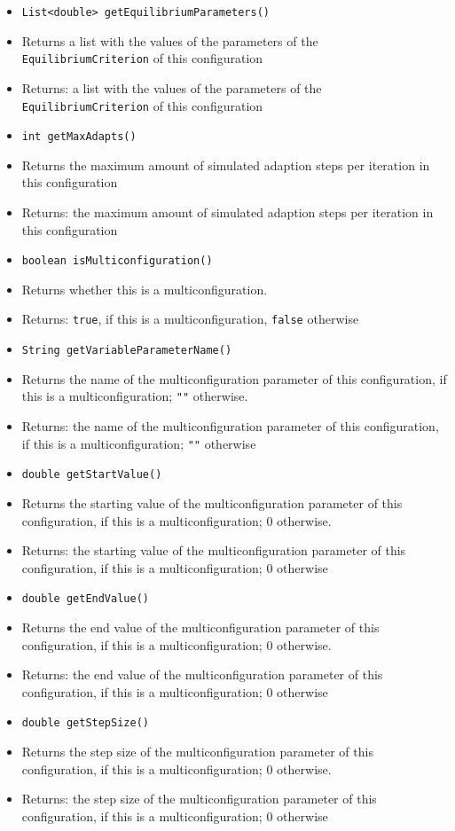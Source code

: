 \documentclass[parskip=full,11pt]{scrartcl}
\begin{document}
\begin{itemize}
	\item \texttt{List<double> getEquilibriumParameters()}
	\item[] Returns a list with the values of the parameters of the \texttt{EquilibriumCriterion} of this configuration
	\item[] Returns: a list with the values of the parameters of the \texttt{EquilibriumCriterion} of this configuration

	\item \texttt{int getMaxAdapts()}
	\item[] Returns the maximum amount of simulated adaption steps per iteration in this configuration
	\item[] Returns: the maximum amount of simulated adaption steps per iteration in this configuration

	\item \texttt{boolean isMulticonfiguration()}
	\item[] Returns whether this is a multiconfiguration.
	\item[] Returns: \texttt{true}, if this is a multiconfiguration, \texttt{false} otherwise

	\item \texttt{String getVariableParameterName()}
	\item[] Returns the name of the multiconfiguration parameter of this configuration, if this is a multiconfiguration; \texttt{""} otherwise.
	\item[] Returns: the name of the multiconfiguration parameter of this configuration, if this is a multiconfiguration; \texttt{""} otherwise

	\item \texttt{double getStartValue()}
	\item[] Returns the starting value of the multiconfiguration parameter of this configuration, if this is a multiconfiguration; \(0\) otherwise.
	\item[] Returns: the starting value of the multiconfiguration parameter of this configuration, if this is a multiconfiguration; \(0\) otherwise

	\item \texttt{double getEndValue()}
	\item[] Returns the end value of the multiconfiguration parameter of this configuration, if this is a multiconfiguration; \(0\) otherwise.
	\item[] Returns: the end value of the multiconfiguration parameter of this configuration, if this is a multiconfiguration; \(0\) otherwise

	\item \texttt{double getStepSize()}
	\item[] Returns the step size of the multiconfiguration parameter of this configuration, if this is a multiconfiguration; \(0\) otherwise.
	\item[] Returns: the step size of the multiconfiguration parameter of this configuration, if this is a multiconfiguration; \(0\) otherwise



\end{itemize}
\end{document}

